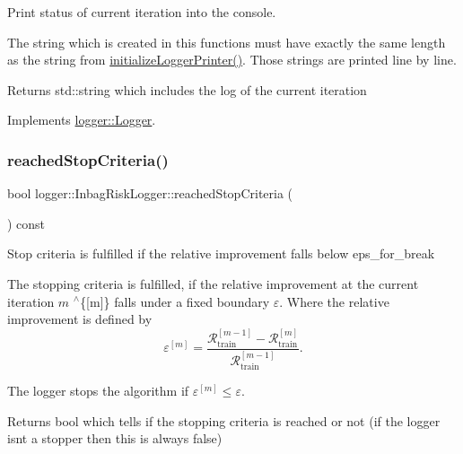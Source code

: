 Print status of current iteration into the console. 

The string which is created in this functions must have exactly the same length as the string from {\ttfamily \mbox{\hyperlink{classlogger_1_1_inbag_risk_logger_ab793454f28dae8d0901852b41a910ec7}{initialize\+Logger\+Printer()}}}. Those strings are printed line by line.

\begin{DoxyReturn}{Returns}
{\ttfamily std\+::string} which includes the log of the current iteration 
\end{DoxyReturn}


Implements \mbox{\hyperlink{classlogger_1_1_logger_abad818a7e8053ca84cb267e883b5e377}{logger\+::\+Logger}}.

\mbox{\label{classlogger_1_1_inbag_risk_logger_a17a7416e4cc9db4da3b3eda5012ad7c7}} 
\subsubsection{\texorpdfstring{reached\+Stop\+Criteria()}{reachedStopCriteria()}}
{\footnotesize\ttfamily bool logger\+::\+Inbag\+Risk\+Logger\+::reached\+Stop\+Criteria (\begin{DoxyParamCaption}{ }\end{DoxyParamCaption}) const\hspace{0.3cm}{\ttfamily [virtual]}}



Stop criteria is fulfilled if the relative improvement falls below {\ttfamily eps\+\_\+for\+\_\+break} 

The stopping criteria is fulfilled, if the relative improvement at the current iteration $m$ $^\wedge$\{\mbox{[}m\mbox{]}\} falls under a fixed boundary $\varepsilon$. Where the relative improvement is defined by \[ \varepsilon^{[m]} = \frac{\mathcal{R}_\mathrm{train}^{[m-1]} - \mathcal{R}_\mathrm{train}^{[m]}}{\mathcal{R}_\mathrm{train}^{[m-1]}}. \]

The logger stops the algorithm if $\varepsilon^{[m]} \leq \varepsilon$.

\begin{DoxyReturn}{Returns}
{\ttfamily bool} which tells if the stopping criteria is reached or not (if the logger isn\textquotesingle{}t a stopper then this is always false) 
\end{DoxyReturn}


